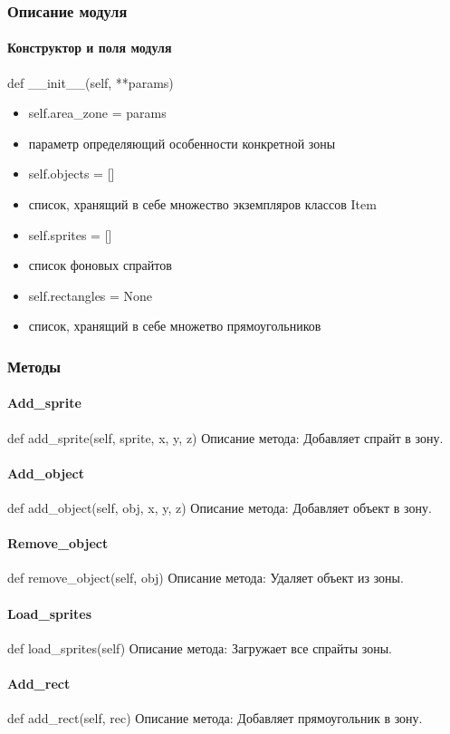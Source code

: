 \subsubsection{Описание модуля}
\paragraph{Конструктор и поля модуля}
def \_\_init\_\_(self, **params)
\begin{itemize}
	\item self.area\_zone = params 
	\item параметр определяющий особенности конкретной зоны
	\item self.objects = [] 
	\item список, хранящий в себе множество экземпляров классов Item
	\item self.sprites = [] 
	\item список фоновых спрайтов
	\item self.rectangles = None 
	\item список, хранящий в себе множетво прямоугольников
\end{itemize}
\subsubsection{Методы}
\paragraph{Add\_sprite}
def add\_sprite(self, sprite, x, y, z)
Описание метода: Добавляет спрайт в зону.
\paragraph{Add\_object}
def add\_object(self, obj, x, y, z)
Описание метода: Добавляет объект в зону.
\paragraph{Remove\_object}
def remove\_object(self, obj)
Описание метода: Удаляет объект из зоны.
\paragraph{Load\_sprites}
def load\_sprites(self)
Описание метода: Загружает все спрайты зоны.
\paragraph{Add\_rect}
def add\_rect(self, rec)
Описание метода: Добавляет прямоугольник в зону.
